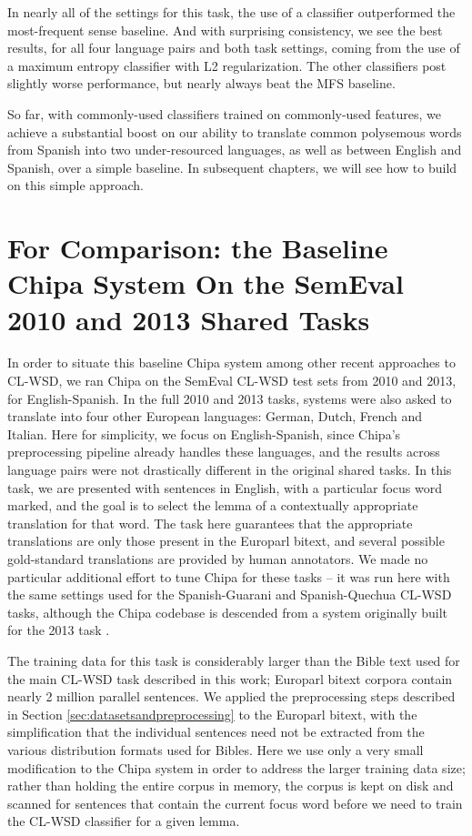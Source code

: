 In nearly all of the settings for this task, the use of a classifier
outperformed the most-frequent sense baseline. And with surprising consistency,
we see the best results, for all four language pairs and both task settings,
coming from the use of a maximum entropy classifier with L2 regularization. The
other classifiers post slightly worse performance, but nearly always beat the
MFS baseline.

So far, with commonly-used classifiers trained on commonly-used features, we
achieve a substantial boost on our ability to translate common polysemous words
from Spanish into two under-resourced languages, as well as between English and
Spanish, over a simple baseline. In subsequent chapters, we will see how to
build on this simple approach.

\section{For Comparison: the Baseline Chipa System On the SemEval 2010 and 2013
Shared Tasks}
\label{sec:baseline-semeval}

In order to situate this baseline Chipa system among other recent approaches to
CL-WSD, we ran Chipa on the SemEval CL-WSD test sets from 2010 and 2013, for
English-Spanish.
In the full 2010 and 2013 tasks, systems were also asked to translate into four
other European languages: German, Dutch, French and Italian. 
Here for simplicity, we focus on English-Spanish, since Chipa's preprocessing
pipeline already handles these languages, and the results across language pairs
were not drastically different in the original shared tasks.
In this task, we are presented with sentences in English, with a particular
focus word marked, and the goal is to select the lemma of a contextually
appropriate translation for that word\cite{lefever-hoste:2010:SemEval,task10}.
The task here guarantees that the appropriate translations are only those
present in the Europarl bitext, and several possible gold-standard translations
are provided by human annotators.  We made no particular additional effort to
tune Chipa for these tasks -- it was run here with the same settings used for
the Spanish-Guarani and Spanish-Quechua CL-WSD tasks, although the Chipa
codebase is descended from a system originally built for the 2013 task
\cite{rudnick-liu-gasser:2013:SemEval-2013}.

The training data for this task is considerably larger than the Bible text used
for the main CL-WSD task described in this work; Europarl bitext corpora
contain nearly 2 million parallel sentences. We applied the preprocessing steps
described in Section \ref{sec:datasetsandpreprocessing} to the Europarl bitext,
with the simplification that the individual sentences need not be extracted
from the various distribution formats used for Bibles.
Here we use only a very small modification to the Chipa system in order to
address the larger training data size; rather than holding the entire corpus in
memory, the corpus is kept on disk and scanned for sentences that contain the
current focus word before we need to train the CL-WSD classifier for a given
lemma.

